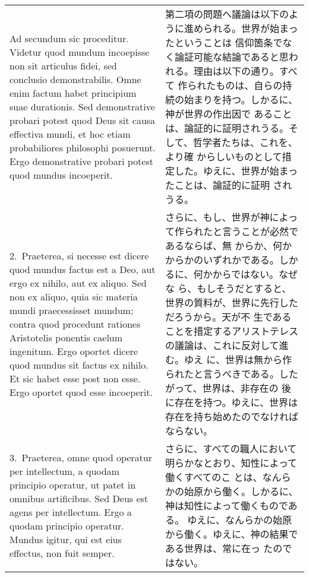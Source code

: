 \documentclass[10pt]{jsarticle} %
\begin{document}
\begin{longtable}{p{21em}p{21em}}

{\LARGE A}{\sc d secundum sic proceditur}. Videtur quod mundum
 incoepisse non sit articulus fidei, sed conclusio demonstrabilis. Omne
 enim factum habet principium suae durationis. Sed demonstrative probari
 potest quod Deus sit causa effectiva mundi, et hoc etiam probabiliores
 philosophi posuerunt. Ergo demonstrative probari potest quod mundus
 incoeperit.


&

第二項の問題へ議論は以下のように進められる。世界が始まったということは
信仰箇条でなく論証可能な結論であると思われる。理由は以下の通り。すべて
作られたものは、自らの持続の始まりを持つ。しかるに、神が世界の作出因で
あることは、論証的に証明されうる。そして、哲学者たちは、これを、より確
からしいものとして措定した。ゆえに、世界が始まったことは、論証的に証明
されうる。



\\

2.~{\sc Praeterea}, si necesse est dicere quod mundus factus est a Deo,
 aut ergo ex nihilo, aut ex aliquo. Sed non ex aliquo, quia sic materia
 mundi praecessisset mundum; contra quod procedunt rationes Aristotelis
 ponentis caelum ingenitum. Ergo oportet dicere quod mundus sit factus
 ex nihilo. Et sic habet esse post non esse. Ergo oportet quod esse
 incoeperit.


&

さらに、もし、世界が神によって作られたと言うことが必然であるならば、無
からか、何かからかのいずれかである。しかるに、何かからではない。なぜな
ら、もしそうだとすると、世界の質料が、世界に先行しただろうから。天が不
生であることを措定するアリストテレスの議論は、これに反対して進む。ゆえ
に、世界は無から作られたと言うべきである。したがって、世界は、非存在の
後に存在を持つ。ゆえに、世界は存在を持ち始めたのでなければならない。

\\


3.~{\sc Praeterea}, omne quod operatur per intellectum, a quodam
 principio operatur, ut patet in omnibus artificibus. Sed Deus est agens
 per intellectum. Ergo a quodam principio operatur. Mundus igitur, qui
 est eius effectus, non fuit semper.


&


さらに、すべての職人において明らかなとおり、知性によって働くすべてのこ
とは、なんらかの始原から働く。しかるに、神は知性によって働くものである。
ゆえに、なんらかの始原から働く。ゆえに、神の結果である世界は、常に在っ
たのではない。


\end{longtable}
\end{document}
